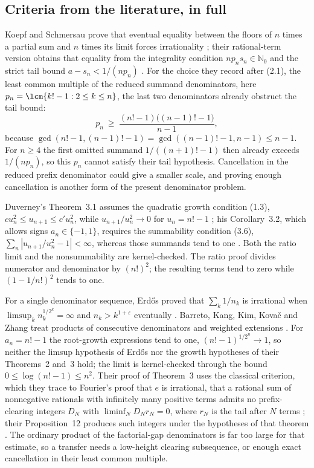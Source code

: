 \subsection{Criteria from the literature, in full}\label{long68:sec:ext-literature}

Koepf and Schmersau prove that eventual equality between the floors of $n$
times a partial sum and $n$ times its limit forces irrationality
\cite[Thm.~1.1, p.~117]{koepf-schmersau}; their rational-term version obtains
that equality from the integrality condition $np_ns_n\in\mathbb N_0$ and the
strict tail bound $a-s_n<1/(np_n)$
\cite[(2.1) and (2.3), p.~118; Thms.~2.2--2.3, pp.~119--120]{koepf-schmersau}.
For the choice they record after (2.1), the least common multiple of the
reduced summand denominators, here $p_n=\lcm\{k!-1:2\le k\le n\}$, the last
two denominators already obstruct the tail bound:
\[
 p_n\ \ge\ \frac{(n!-1)\bigl((n-1)!-1\bigr)}{n-1},
\]
because $\gcd(n!-1,(n-1)!-1)=\gcd((n-1)!-1,n-1)\le n-1$.  For $n\ge4$ the
first omitted summand $1/((n+1)!-1)$ then already exceeds $1/(np_n)$, so this
$p_n$ cannot satisfy their tail hypothesis.  Cancellation in the reduced
prefix denominator could give a smaller scale, and proving enough
cancellation is another form of the present denominator problem.

Duverney's Theorem~3.1 assumes the quadratic growth condition (1.3),
$cu_n^2\le u_{n+1}\le c'u_n^2$, while $u_{n+1}/u_n^2\to0$ for $u_n=n!-1$
\cite[(1.3), p.~275; Thm.~3.1, pp.~285--286]{duverney}; his Corollary~3.2,
which allows signs $a_n\in\{-1,1\}$, requires the summability condition (3.6),
$\sum_n|u_{n+1}/u_n^2-1|<\infty$, whereas those summands tend to one
\cite[Cor.~3.2, p.~287]{duverney}.  Both the ratio limit
and the nonsummability are kernel-checked.  The ratio proof divides numerator
and denominator by $(n!)^2$; the resulting terms tend to zero while
$(1-1/n!)^2$ tends to one.

For a single denominator sequence, Erd\H{o}s proved that $\sum_k1/n_k$ is
irrational when $\limsup_kn_k^{1/2^k}=\infty$ and $n_k>k^{1+\varepsilon}$
eventually \cite[Theorem~1, p.~1]{erdos1975}.  Barreto, Kang, Kim, Kova\v{c}
and Zhang treat products of consecutive denominators and weighted extensions
\cite[Thms.~2--3 and Rem.~4, pp.~2--5]{barreto-et-al}.  For $a_n=n!-1$ the
root-growth expressions tend to one, $(n!-1)^{1/2^n}\to1$, so neither the
limsup hypothesis of Erd\H{o}s nor the growth hypotheses of their Theorems~2
and~3 hold; the limit is kernel-checked through the bound
$0\le\log(n!-1)\le n^2$.  Their proof of Theorem~3 uses the classical
criterion, which they trace to Fourier's proof that $e$ is irrational, that a
rational sum of nonnegative rationals with infinitely many positive terms
admits no prefix-clearing integers $D_N$ with $\liminf_ND_Nr_N=0$, where $r_N$
is the tail after $N$ terms \cite[Lem.~8, p.~6]{barreto-et-al}; their
Proposition~12 produces such integers under the hypotheses of that theorem
\cite[pp.~9--12]{barreto-et-al}.
The ordinary product of the factorial-gap denominators is far too large for
that estimate, so a transfer needs a low-height clearing subsequence, or
enough exact cancellation in their least common multiple.


